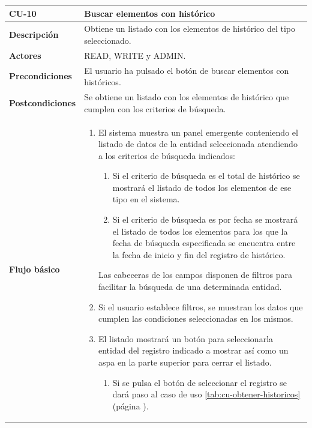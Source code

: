 
\begin{table} [H]
    \centering
    \setlength{\leftmargini}{0.4cm}
	\resizebox{14cm}{!} { %
    \begin{tabular}{| m{3cm} | m{11cm} |}   
    \hline
	  \textbf{CU-10} & \textbf{Buscar elementos con histórico} \\\hline
	  \textbf{Descripción} & Obtiene un listado con los elementos de histórico del tipo seleccionado. \\\hline
	  \textbf{Actores} & READ, WRITE y ADMIN. \\\hline
	  \textbf{Precondiciones} & El usuario ha pulsado el botón de buscar elementos con históricos. \\\hline
	  \textbf{Postcondiciones} & Se obtiene un listado con los elementos de histórico que cumplen con los criterios de búsqueda. \\\hline
	  \textbf{Flujo básico} & 
		\begin{enumerate}
	  	\item El sistema muestra un panel emergente conteniendo el listado de datos de la entidad seleccionada atendiendo a los criterios de búsqueda indicados:
			\begin{enumerate}	
			   \item Si el criterio de búsqueda es el total de histórico se mostrará el listado de todos los elementos de ese tipo en el sistema.
			   \item Si el criterio de búsqueda es por fecha se mostrará el listado de todos los elementos para los que la fecha de búsqueda especificada se encuentra entre la fecha de inicio y fin del registro de histórico.
			\end{enumerate}
		    Las cabeceras de los campos disponen de filtros para facilitar la búsqueda de una determinada entidad.
		\item Si el usuario establece filtros, se muestran los datos que cumplen las condiciones seleccionadas en los mismos.
		\item El listado mostrará un botón para seleccionarla entidad del registro indicado a mostrar así como un aspa en la parte superior para cerrar el listado.
		       \begin{enumerate}	
			        \item Si se pulsa el botón de seleccionar el registro se dará paso al caso de uso \ref{tab:cu-obtener-historicos} (página \pageref{tab:cu-obtener-historicos}).

\end{enumerate}
\end{enumerate}
\end{tabular}}
\end{table}
